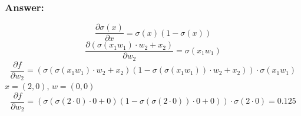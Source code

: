 \documentclass{article}
\begin{document}
\subsubsection*{Answer:}
\begin{equation*}
    \frac{\partial\sigma(x)}{\partial x} = \sigma(x)(1-\sigma(x))
\end{equation*}
\begin{equation*}
    \frac{\partial(\sigma(x_1w_1)\cdot w_2 + x_2)}{\partial w_2} = \sigma(x_1w_1)
\end{equation*}
\begin{equation*}
    \frac{\partial f}{\partial w_2} = (\sigma(\sigma(x_1w_1)\cdot w_2 + x_2)(1-\sigma(\sigma(x_1w_1))\cdot w_2 + x_2))\cdot\sigma(x_1w_1)
\end{equation*}
$x = (2,0)$, $w = (0,0)$
\begin{equation*}
    \frac{\partial f}{\partial w_2} = (\sigma(\sigma(2\cdot0)\cdot0 + 0)(1-\sigma(\sigma(2\cdot0))\cdot0 + 0))\cdot\sigma(2\cdot0) = 0.125
\end{equation*}
\end{document}
